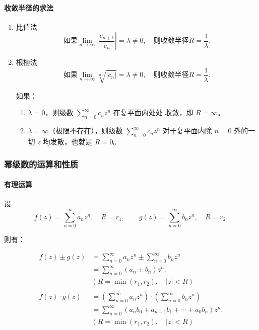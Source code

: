 \paragraph{收敛半径的求法}
\label{收敛半径的求法}
\begin{enumerate}
\item 比值法
\label{比值法}
\[
\boxed{
    \text{如果} \lim_{n \to \infty} \left|\frac{c_{n+1}}{c_n}\right| = \lambda \ne 0, \quad \text{则收敛半径} R=\frac{1}{\lambda}.
}
\]
\item 根植法
\label{根植法}
\[
\boxed{
    \text{如果} \lim_{n \to \infty} \sqrt[n]{|c_n|} = \lambda \ne 0, \quad \text{则收敛半径} R = \frac{1}{\lambda}.
}
\]

\begin{tcolorbox}[title={注意},colback=red!5!white
,colframe=red!75!black
,colbacktitle=yellow!50!red
,coltitle=red!25!black, fonttitle=\bfseries,subtitle style={boxrule=0.4pt, colback=yellow!50!red!25!white}]
如果：
\begin{enumerate}
\item \(\lambda = 0\)，则级数 \(\sum\limits _{n=0}^{\infty}c_n z^n\) 在复平面内处处
收敛，即 \(\boxed{R=\infty}\)。
\item \(\lambda = \infty\)（极限不存在），则级数 \(\sum\limits _{n=0}^{\infty}c_n
   z^n\) 对于复平面内除 \(n=0\) 外的一切 \(z\) 均发散，也就是 \(\boxed{R=0}\)。
\end{enumerate}

\end{tcolorbox}
\end{enumerate}
\subsubsection{幂级数的运算和性质}
\label{幂级数的运算和性质}
\paragraph{有理运算}
\label{有理运算}
设
\[
f(z)=\sum_{n=0}^{\infty} a_{n}z^{n},\quad R=r_{1},\qquad g(z)=\sum_{n=0}^{\infty} b_{n}z^{n},\quad R=r_{2}.
\]

则有：

\begin{align*}
    f(z)\pm g(z)&=\sum_{n=0}^{\infty} a_{n}z^{n}\pm\sum_{n=0}^{\infty} b_{n}z^{n}\\
    &=\sum_{n=0}^{\infty}(a_{n}\pm b_{n})z^{n}.\\
    & (R=\min(r_{1},r_{2}), \quad |z| < R)\\
    \\
    f(z)\cdot g(z)&=\left(\sum_{n=0}^{\infty} a_{n}z^{n}\right)\cdot\left(\sum_{n=0}^{\infty} b_{n}z^{n}\right)\\
    &=\sum_{n=0}^{\infty}\left(a_{n}b_{0}+a_{n-1}b_{1}+\cdots+a_{0} b_{n}\right)z^{n}.\\
    & (R=\min(r_{1},r_{2}), \quad |z| < R)
\end{align*}
